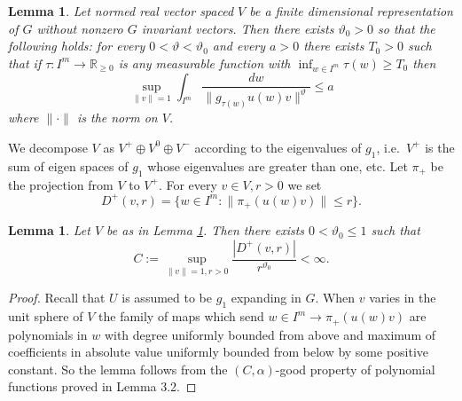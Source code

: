 \documentclass[12pt]{amsart}
\newtheorem{lem}[thm]{Lemma}
\theoremstyle{definition}
\theoremstyle{remark}
\numberwithin{equation}{section}
\begin{document}
 \begin{lem}\label{lem;estimate}
Let   normed  real vector spaced  $V$ be a finite dimensional representation of 
 $G$ without  nonzero  $G$ invariant vectors.  
 Then there exists 
 $\vartheta_0>0$ so that the following holds:
  for every $0<\vartheta<\vartheta_0$  and every $a>0$ there exists $T_0>0$ such that 
 if  $\tau: I^m\to \mathbb R_{\ge 0}$ is any measurable function  with
 $\inf_{w\in I^m} \tau(w)\ge T_0$ then
  \begin{equation}\label{eq;goal estimate}
\sup _{ \|v\|=1}\int_{I^m} \frac{dw}{\|g_{\tau(w)} u(w)v\|^\vartheta}\le  a
 \end{equation}
 where $\|\cdot \|$ is the norm on $V$. 
\end{lem}

We decompose   $V$ as
 $V^+\oplus V^0\oplus V^-$ according to the  eigenvalues
of $g_1$, i.e.~$V^+$ is the  sum of eigen spaces  of $g_1$
whose eigenvalues are greater than one, etc. 
Let $ \pi_+$ be the  projection from $V$ 
to $V^+$.
 For every $v\in V, r>0$
we set 
\[
D^+(v, r)=\{w\in I^m: \|\pi_+(u(w)v)\|\le r\}.
\]

\begin{lem}\label{lem;good}
Let $V$ be as in Lemma \ref{lem;estimate}.
Then there exists $0<\vartheta_0 \le 1$ such that
\begin{equation}\label{eq;uniform}
C:=\sup _{ \|v\|=1, r>0}\frac{|D^+(v,r)|}{r^{\vartheta_0}}<\infty.
\end{equation}
\end{lem}
\begin{proof}
Recall that   $U$ is  assumed to be $ g_1 $ expanding in $G$. 
When $v$ varies in the unit sphere of $V$ the family of  maps  which send
$w\in I^m\to\pi_+(u(w)v)$ are polynomials in $w$ with  degree uniformly bounded from above and
maximum of coefficients in absolute value uniformly bounded  from below
by some positive constant.  So
the lemma follows from the $(C, \alpha )$-good property of polynomial functions  proved in 
\cite{bkm01} Lemma 3.2.
\end{proof}
\end{document}
